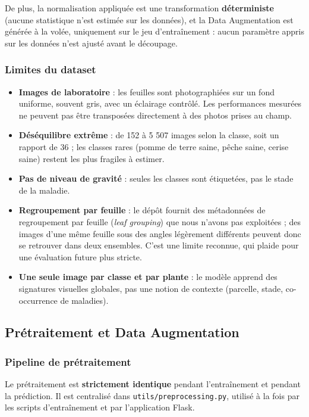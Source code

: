 \documentclass[10pt,a4paper]{article}
\begin{document}
De plus, la normalisation appliquée est une transformation \textbf{déterministe} (aucune statistique n'est estimée sur les données), et la Data Augmentation est générée à la volée, uniquement sur le jeu d'entraînement : aucun paramètre appris sur les données n'est ajusté avant le découpage.

\subsubsection{Limites du dataset}

\begin{itemize}
\item \textbf{Images de laboratoire} : les feuilles sont photographiées sur un fond uniforme, souvent gris, avec un éclairage contrôlé. Les performances mesurées ne peuvent pas être transposées directement à des photos prises au champ.
\item \textbf{Déséquilibre extrême} : de 152 à 5 507 images selon la classe, soit un rapport de 36 ; les classes rares (pomme de terre saine, pêche saine, cerise saine) restent les plus fragiles à estimer.
\item \textbf{Pas de niveau de gravité} : seules les classes sont étiquetées, pas le stade de la maladie.
\item \textbf{Regroupement par feuille} : le dépôt fournit des métadonnées de regroupement par feuille (\emph{leaf grouping}) que nous n'avons pas exploitées ; des images d'une même feuille sous des angles légèrement différents peuvent donc se retrouver dans deux ensembles. C'est une limite reconnue, qui plaide pour une évaluation future plus stricte.
\item \textbf{Une seule image par classe et par plante} : le modèle apprend des signatures visuelles globales, pas une notion de contexte (parcelle, stade, co-occurrence de maladies).
\end{itemize}

\subsection{Prétraitement et Data Augmentation}

\subsubsection{Pipeline de prétraitement}

Le prétraitement est \textbf{strictement identique} pendant l'entraînement et pendant la prédiction. Il est centralisé dans \texttt{utils/\allowbreak{}preprocessing.py}, utilisé à la fois par les scripts d'entraînement et par l'application Flask.
\end{document}
